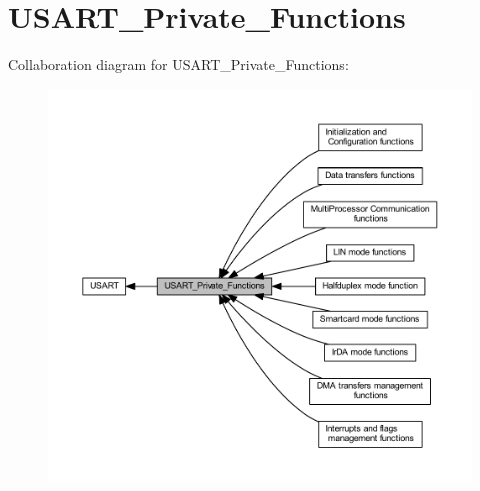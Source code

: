 \hypertarget{group___u_s_a_r_t___private___functions}{}\section{U\+S\+A\+R\+T\+\_\+\+Private\+\_\+\+Functions}
\label{group___u_s_a_r_t___private___functions}
Collaboration diagram for U\+S\+A\+R\+T\+\_\+\+Private\+\_\+\+Functions\+:\nopagebreak
\begin{figure}[H]
\begin{center}
\leavevmode
\includegraphics[width=350pt]{group___u_s_a_r_t___private___functions}
\end{center}
\end{figure}
